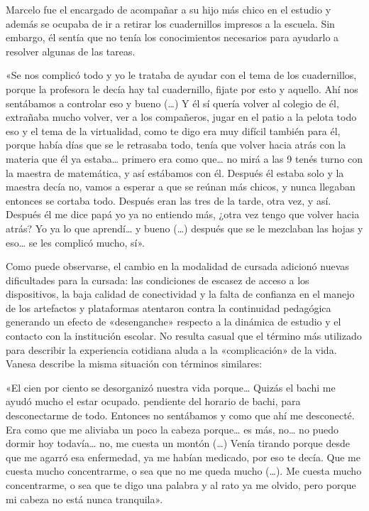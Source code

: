 \begin{refsection}
Marcelo fue el encargado de acompañar a su hijo más chico en el estudio y además se ocupaba de ir a retirar los cuadernillos impresos a la escuela. Sin embargo, él sentía que no tenía los conocimientos necesarios para ayudarlo a resolver algunas de las tareas.


\begin{gbcita}
«Se nos complicó todo y yo le trataba de ayudar con el tema de los cuadernillos, porque la profesora le decía hay tal cuadernillo, fijate por esto y aquello. Ahí nos sentábamos a controlar eso y bueno (…) Y él sí quería volver al colegio de él, extrañaba mucho volver, ver a los compañeros, jugar en el patio a la pelota todo eso y el tema de la virtualidad, como te digo era muy difícil también para él, porque había días que se le retrasaba todo, tenía que volver hacia atrás con la materia que él ya estaba… primero era como que… no mirá a las 9 tenés turno con la maestra de matemática, y así estábamos con él. Después él estaba solo y la maestra decía no, vamos a esperar a que se reúnan más chicos, y nunca llegaban entonces se cortaba todo. Después eran las tres de la tarde, otra vez, y así. Después él me dice papá yo ya no entiendo más, ¿otra vez tengo que volver hacia atrás? Yo ya lo que aprendí… y bueno (…) después que se le mezclaban las hojas y eso… se les complicó mucho, sí».

\end{gbcita}

Como puede observarse, el cambio en la modalidad de cursada adicionó nuevas dificultades para la cursada: las condiciones de escasez de acceso a los dispositivos, la baja calidad de conectividad y la falta de confianza en el manejo de los artefactos y plataformas atentaron contra la continuidad pedagógica generando un efecto de «desenganche» respecto a la dinámica de estudio y el contacto con la institución escolar. No resulta casual que el término más utilizado para describir la experiencia cotidiana aluda a la «complicación» de la vida. Vanesa describe la misma situación con términos similares:


\begin{gbcita}
«El cien por ciento se desorganizó nuestra vida porque… Quizás el bachi me ayudó mucho el estar ocupado. pendiente del horario de bachi, para desconectarme de todo. Entonces no sentábamos y como que ahí me desconecté. Era como que me aliviaba un poco la cabeza porque… es más, no… no puedo dormir hoy todavía… no, me cuesta un montón (…) Venía tirando porque desde que me agarró esa enfermedad, ya me habían medicado, por eso te decía. Que me cuesta mucho concentrarme, o sea que no me queda mucho (…). Me cuesta mucho concentrarme, o sea que te digo una palabra y al rato ya me olvido, pero porque mi cabeza no está nunca tranquila».


\end{gbcita}
\end{refsection}
